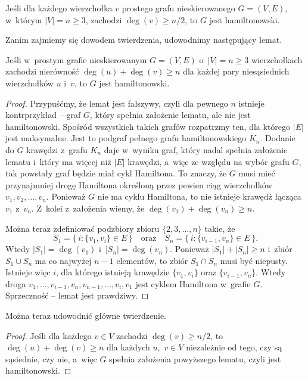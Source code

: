 \subproblem %
\begin{twierdzenie}[Dirac]
	Jeśli dla każdego wierzchołka $v$ prostego grafu nieskierowanego $G=(V,E)$, w~którym $|V|=n\ge3$, zachodzi $\deg(v)\ge n/2$, to $G$ jest hamiltonowski.
\end{twierdzenie}
Zanim zajmiemy się dowodem twierdzenia, udowodnimy następujący lemat.
\begin{lemat}[Ore]
	Jeśli w~prostym grafie nieskierowanym $G=(V,E)$ o~$|V|=n\ge3$ wierzchołkach zachodzi nierówność $\deg(u)+\deg(v)\ge n$ dla każdej pary niesąsiednich wierzchołków $u$ i~$v$, to $G$ jest hamiltonowski.
\end{lemat}
\begin{proof}
Przypuśćmy, że lemat jest fałszywy, czyli dla pewnego $n$ istnieje kontrprzykład -- graf $G$, który spełnia założenie lematu, ale nie jest hamiltonowski. Spośród wszystkich takich grafów rozpatrzmy ten, dla którego $|E|$ jest maksymalne. Jest to podgraf pełnego grafu hamiltonowskiego $K_n$. Dodanie do $G$ krawędzi z~grafu $K_n$ daje w~wyniku graf, który nadal spełnia założenie lematu i~który ma więcej niż $|E|$ krawędzi, a~więc ze względu na wybór grafu $G$, tak powstały graf będzie miał cykl Hamiltona. To znaczy, że $G$ musi mieć przynajmniej drogę Hamiltona określoną przez pewien ciąg wierzchołków $v_1,v_2,\dots,v_n$. Ponieważ $G$ nie ma cyklu Hamiltona, to nie istnieje krawędź łącząca $v_1$ z~$v_n$. Z~kolei z~założenia wiemy, że $\deg(v_1)+\deg(v_n)\ge n$.

Można teraz zdefiniować podzbiory zbioru $\{2,3,\dots,n\}$ takie, że
\[
	S_1 = \bigl\{\,i:\{v_1,v_i\}\in E\,\bigr\} \quad\text{oraz}\quad S_n = \bigl\{\,i:\{v_{i-1},v_n\}\in E\,\bigr\}.
\]
Wtedy $|S_1|=\deg(v_1)$ i~$|S_n|=\deg(v_n)$. Ponieważ $|S_1|+|S_n|\ge n$ i~zbiór $S_1\cup S_n$ ma co najwyżej $n-1$ elementów, to zbiór $S_1\cap S_n$ musi być niepusty. Istnieje więc $i$, dla którego istnieją krawędzie $\{v_1,v_i\}$ oraz $\{v_{i-1},v_n\}$. Wtedy droga $v_1,\dots,v_{i-1},v_n,v_{n-1},\dots,v_i,v_1$ jest cyklem Hamiltona w~grafie $G$. Sprzeczność -- lemat jest prawdziwy.
\end{proof}

Można teraz udowodnić główne twierdzenie.
\begin{proof}
Jeśli dla każdego $v\in V$ zachodzi $\deg(v)\ge n/2$, to $\deg(u)+\deg(v)\ge n$ dla każdych $u$,~$v\in V$ niezależnie od tego, czy są sąsiednie, czy nie, a~więc $G$ spełnia założenia powyższego lematu, czyli jest hamiltonowski.
\end{proof}

